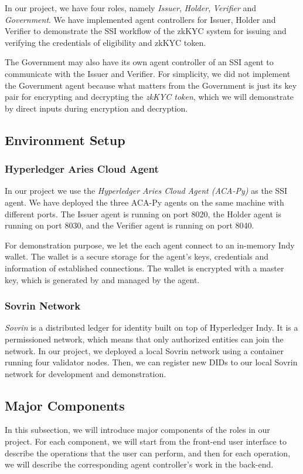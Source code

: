 \documentclass[
]{report}
\begin{document}
In our project, we have four roles, namely \emph{Issuer}, \emph{Holder},
\emph{Verifier} and \emph{Government}. We have implemented agent controllers
for Issuer, Holder and Verifier to demonstrate the SSI workflow of the
zkKYC system for issuing and verifying the credentials of eligibility and
zkKYC token.

The Government may also have its own agent controller of
an SSI agent to communicate with the Issuer and Verifier. For simplicity,
we did not implement the Government agent because what matters from the
Government is just its key pair for encrypting and decrypting the
\emph{zkKYC token}, which we will demonstrate by direct inputs during
encryption and decryption.

\subsection{Environment Setup}
\subsubsection{Hyperledger Aries Cloud Agent}
In our project we use the \emph{Hyperledger Aries Cloud Agent (ACA-Py)}
as the SSI agent. We have deployed the three ACA-Py agents on the same
machine with different ports. The Issuer agent is running on port 8020,
the Holder agent is running on port 8030, and the Verifier agent is
running on port 8040.

For demonstration purpose, we let the each agent connect to an in-memory
Indy wallet. The wallet is a secure storage for the agent's keys,
credentials and information of established connections. The wallet is
encrypted with a master key, which is generated by and managed by the
agent.

\subsubsection{Sovrin Network}
\emph{Sovrin} is a distributed ledger for identity built on top of
Hyperledger Indy. It is a permissioned network, which means that only
authorized entities can join the network. In our project, we deployed a
local Sovrin network using a container running four validator nodes.
Then, we can register new DIDs to our local Sovrin network for development
and demonstration.

\subsection{Major Components}
In this subsection, we will introduce major components of the roles
in our project. For each component, we will start from the front-end user
interface to describe the operations that the user can perform, and then
for each operation, we will describe the corresponding agent controller's
work in the back-end.
\end{document}
